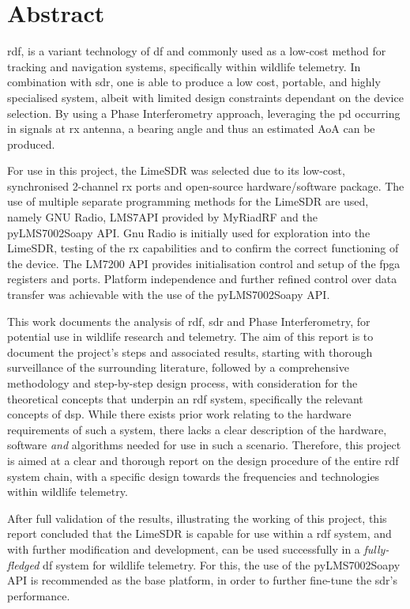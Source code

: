 \documentclass[class=report,11pt,crop=false]{standalone}
\begin{document}
\chapter*{Abstract}

\gls{rdf}, is a variant technology of \gls{df} and commonly used as a low-cost method for tracking and navigation systems, specifically within wildlife telemetry. In combination with \gls{sdr}, one is able to produce a low cost, portable, and highly specialised system, albeit with limited design constraints dependant on the device selection. By using a Phase Interferometry approach, leveraging the \gls{pd} occurring in signals at \gls{rx} antenna, a bearing angle and thus an estimated \gls{AoA} can be produced. 

For use in this project, the LimeSDR was selected due to its low-cost, synchronised 2-channel \gls{rx} ports and open-source hardware/software package. The use of multiple separate programming methods for the LimeSDR are used, namely GNU Radio,  LMS7\gls{API} provided by MyRiadRF and the pyLMS7002Soapy \gls{API}. Gnu Radio is initially used for exploration into the LimeSDR, testing of the \gls{rx} capabilities and to confirm the correct functioning of the device. The LM7200 \gls{API} provides initialisation control and setup of the \gls{fpga} registers and ports. Platform independence and further refined control over data transfer was achievable with the use of the pyLMS7002Soapy \gls{API}.

This work documents the analysis of \gls{rdf}, \gls{sdr} and Phase Interferometry, for potential use in wildlife research and telemetry. The aim of this report is to document the project's steps and associated results, starting with thorough surveillance of the surrounding literature, followed by a comprehensive methodology and step-by-step design process, with consideration for the theoretical concepts that underpin an \gls{rdf} system, specifically the relevant concepts of \gls{dsp}. While there exists prior work relating to the hardware requirements of such a system, there lacks a clear description of the hardware, software \emph{and} algorithms needed for use in such a scenario. Therefore, this project is aimed at a clear and thorough report on the design procedure of the entire \gls{rdf} system chain, with a specific design towards the frequencies and technologies within wildlife telemetry. 

After full validation of the results, illustrating the working of this project, this report concluded that the LimeSDR is capable for use within a \gls{rdf} system, and with further modification and development, can be used successfully in a \emph{fully-fledged} \gls{df} system for wildlife telemetry. For this, the use of the pyLMS7002Soapy \gls{API} is recommended as the base platform, in order to further fine-tune the \gls{sdr}'s performance. 



\ifstandalone
 \printnoidxglossary[type=\acronymtype,nonumberlist]
\fi
\end{document}
